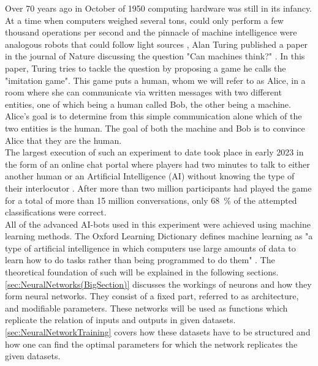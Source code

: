 Over 70 years ago in October of 1950 computing hardware was still in its infancy. At a time when computers weighed several tons, could only perform a few thousand operations per second and the pinnacle of machine intelligence were analogous robots that could follow light sources \cite{FirstThinkingMachinesArticle}, Alan Turing published a paper in the journal of Nature discussing the question "Can machines think?" \cite{TuringThinkingPaper}. In this paper, Turing tries to tackle the question by proposing a game he calls the "imitation game". This game puts a human, whom we will refer to as Alice, in a room where she can communicate via written messages with two different entities, one of which being a human called Bob, the other being a machine. Alice's goal is to determine from this simple communication alone which of the two entities is the human. The goal of both the machine and Bob is to convince Alice that they are the human.\\
The largest execution of such an experiment to date took place in early 2023 in the form of an online chat portal where players had two minutes to talk to either another human or an Artificial Intelligence (AI) without knowing the type of their interlocutor \cite{TuringGamePaper}. After more than two million participants had played the game for a total of more than 15 million conversations, only \SI{68}{\percent} of the attempted classifications were correct.\\
All of the advanced AI-bots used in this experiment were achieved using machine learning methods. The Oxford Learning Dictionary defines machine learning as "a type of artificial intelligence in which computers use large amounts of data to learn how to do tasks rather than being programmed to do them" \cite{MLDefinition}. The theoretical foundation of such will be explained in the following sections.\\
\cref{sec:NeuralNetworks(BigSection)} discusses the workings of neurons and how they form neural networks. They consist of a fixed part, referred to as architecture, and modifiable parameters. These networks will be used as functions which replicate the relation of inputs and outputs in given datasets. \cref{sec:NeuralNetworkTraining} covers how these datasets have to be structured and how one can find the optimal parameters for which the network replicates the given datasets.

